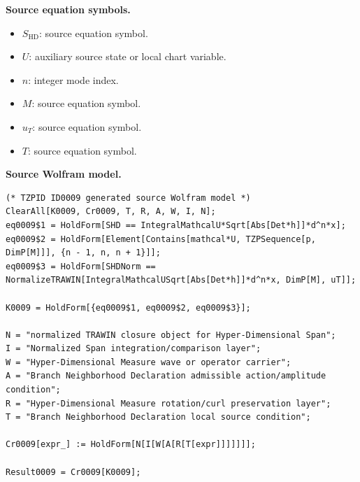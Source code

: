\begin{minipage}[t]{0.49\linewidth}
\begingroup
\small
\raggedright
\textbf{Source equation symbols.}\par
\begin{itemize}[leftmargin=1.35em,itemsep=1pt,topsep=1pt,parsep=0pt]
    \item $S_{\mathrm{HD}}$: source equation symbol.
    \item $U$: auxiliary source state or local chart variable.
    \item $n$: integer mode index.
    \item $M$: source equation symbol.
    \item $u_{T}$: source equation symbol.
    \item $T$: source equation symbol.
\end{itemize}
\endgroup
\end{minipage}\hfill
\begin{minipage}[t]{0.47\linewidth}
\begingroup
\scriptsize
\raggedright
\textbf{Source Wolfram model.}\par
\begin{Verbatim}[fontsize=\tiny,breaklines=true,breakanywhere=true]
(* TZPID ID0009 generated source Wolfram model *)
ClearAll[K0009, Cr0009, T, R, A, W, I, N];
eq0009$1 = HoldForm[SHD == IntegralMathcalU*Sqrt[Abs[Det*h]]*d^n*x];
eq0009$2 = HoldForm[Element[Contains[mathcal*U, TZPSequence[p, DimP[M]]], {n - 1, n, n + 1}]];
eq0009$3 = HoldForm[SHDNorm == NormalizeTRAWIN[IntegralMathcalUSqrt[Abs[Det*h]]*d^n*x, DimP[M], uT]];

K0009 = HoldForm[{eq0009$1, eq0009$2, eq0009$3}];

N = "normalized TRAWIN closure object for Hyper-Dimensional Span";
I = "Normalized Span integration/comparison layer";
W = "Hyper-Dimensional Measure wave or operator carrier";
A = "Branch Neighborhood Declaration admissible action/amplitude condition";
R = "Hyper-Dimensional Measure rotation/curl preservation layer";
T = "Branch Neighborhood Declaration local source condition";

Cr0009[expr_] := HoldForm[N[I[W[A[R[T[expr]]]]]]];

Result0009 = Cr0009[K0009];
\end{Verbatim}
\endgroup
\end{minipage}

